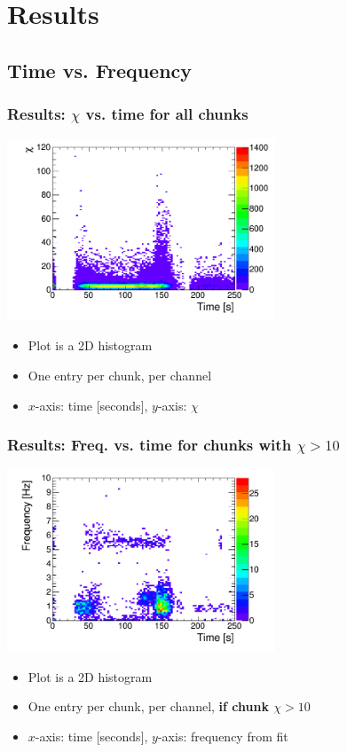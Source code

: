\documentclass[bigger]{beamer}
\providecommand{\alert}[1]{\textbf{#1}}
\begin{document}
\section{Results}
\label{sec-3}
\subsection{Time vs. Frequency}
\label{sec-3-1}
\begin{frame}
\frametitle{Results: $\chi$ vs. time for all chunks}
\label{sec-3-1-1}
\label{sec-3-1-1-1}

\centering
\includegraphics[width=0.6\textwidth]{fig/time_vs_amp_over_significance_hist.png}
\begin{itemize}

\item Plot is a 2D histogram
\label{sec-3-1-1-2}%

\item One entry per chunk, per channel
\label{sec-3-1-1-3}%

\item $x$-axis: time [seconds], $y$-axis: $\chi$
\label{sec-3-1-1-4}%
\end{itemize} %
\end{frame}
\begin{frame}
\frametitle{Results: Freq. vs. time for chunks with $\chi > 10$}
\label{sec-3-1-2}
\label{sec-3-1-2-1}

\centering
\includegraphics[width=0.6\textwidth]{fig/time_vs_frequency_signifOver10_hist.png}
\begin{itemize}

\item Plot is a 2D histogram
\label{sec-3-1-2-2}%

\item One entry per chunk, per channel, \alert{if chunk $\chi > 10$}
\label{sec-3-1-2-3}%

\item $x$-axis: time [seconds], $y$-axis: frequency from fit
\label{sec-3-1-2-4}%
\end{itemize} %
\end{frame}
\end{document}
